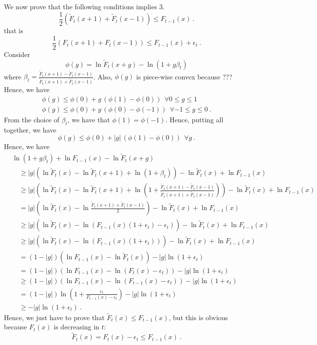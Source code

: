 \documentclass{colt2016_empty} %
\begin{document}
We now prove that the following conditions implies 3.
\[
\frac{1}{2}\left(\tilde{F}_t(x+1)+\tilde{F}_t(x-1)\right) \leq F_{t-1}(x)~.
\]
that is
\[
\frac{1}{2}\left(F_t(x+1)+F_t(x-1)\right) \leq F_{t-1}(x) + \epsilon_t~.
\]
Consider 
\[
\phi(g)=\ln \tilde{F}_{t}(x+g) - \ln \left(1 + g \beta_t \right) 
\]
where $\beta_t=\frac{\tilde{F}_t(x + 1) - \tilde{F}_t(x - 1)}{\tilde{F}_t(x + 1) + \tilde{F}_t(x - 1)}$. 
Also, $\phi(g)$ is piece-wise convex because ???
Hence, we have
\begin{align}
\phi(g) \leq \phi(0) + g \, (\phi(1)-\phi(0)) \ \ \forall 0\leq g\leq 1 \\
\phi(g) \leq \phi(0) + g \, (\phi(0)-\phi(-1)) \ \ \forall -1\leq g\leq 0~.
\end{align}
From the choice of $\beta_t$, we have that $\phi(1)=\phi(-1)$. Hence, putting all together, we have
\[
\phi(g) \leq \phi(0) +|g| \, (\phi(1)-\phi(0)) \ \  \forall g~.
\]
Hence, we have
\begin{align*}
&\ln \left(1 + g \beta_t \right) + \ln F_{t-1}(x) - \ln \tilde{F}_{t}(x+g) \\
&\quad \geq |g| \left(\ln \tilde{F}_{t}(x) -  \ln \tilde{F}_{t}(x+1) + \ln \left(1 + \beta_t \right) \right) - \ln \tilde{F}_{t}(x) + \ln F_{t-1}(x)\\
&\quad \geq |g| \left(\ln \tilde{F}_{t}(x) -  \ln \tilde{F}_{t}(x+1) + \ln \left(1 + \frac{\tilde{F}_t(x + 1) - \tilde{F}_t(x - 1)}{\tilde{F}_t(x + 1) + \tilde{F}_t(x - 1)} \right) \right) - \ln \tilde{F}_{t}(x) + \ln F_{t-1}(x)\\
&\quad= |g| \left(\ln \tilde{F}_{t}(x) - \ln \frac{\tilde{F}_t(x + 1) + \tilde{F}_t(x - 1)}{2}  \right) - \ln \tilde{F}_{t}(x) + \ln F_{t-1}(x)\\
&\quad\geq |g| \left(\ln \tilde{F}_{t}(x) - \ln \left(F_{t-1}(x) (1+\epsilon_t) - \epsilon_t \right)  \right) - \ln \tilde{F}_{t}(x) + \ln F_{t-1}(x)\\
&\quad\geq |g| \left(\ln \tilde{F}_{t}(x) - \ln \left(F_{t-1}(x) (1+\epsilon_t) \right)  \right) - \ln \tilde{F}_{t}(x) + \ln F_{t-1}(x)\\
&\quad= (1-|g|) \left(\ln F_{t-1}(x) -\ln \tilde{F}_{t}(x) \right) - |g|\ln (1+\epsilon_t)\\
&\quad= (1-|g|) \left(\ln F_{t-1}(x) -\ln (F_{t}(x) -\epsilon_t)\right)- |g|\ln (1+\epsilon_t)\\
&\quad\geq (1-|g|) \left(\ln F_{t-1}(x) -\ln (F_{t-1}(x) -\epsilon_t)\right)- |g|\ln (1+\epsilon_t)\\
&\quad= (1-|g|) \ln \left(1+\frac{\epsilon_t}{F_{t-1}(x) -\epsilon_t}\right)- |g|\ln (1+\epsilon_t)\\
&\quad\geq - |g|\ln (1+\epsilon_t)~.
\end{align*}
Hence, we just have to prove that $\tilde{F}_{t}(x)\leq F_{t-1}(x)$, but this is obvious because $F_t(x)$ is decreasing in $t$:
\[
\tilde{F}_t (x)= F_t (x) -\epsilon_t \leq F_{t-1} (x)~.
\]
\end{document}
